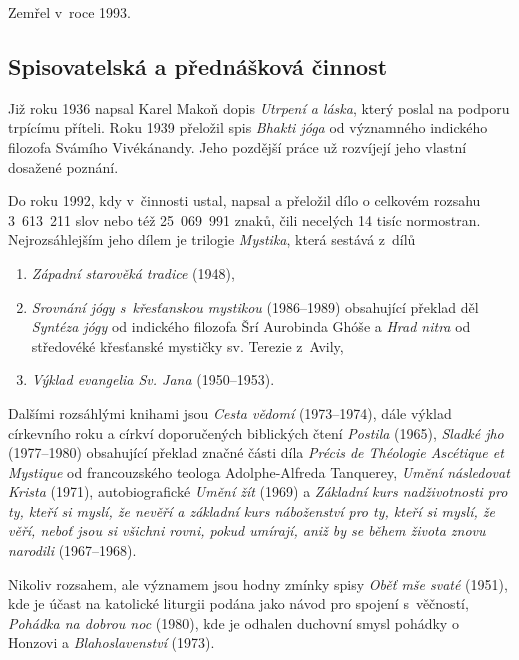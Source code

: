 Zemřel v~roce 1993.

\subsection{Spisovatelská a přednášková činnost}

Již roku 1936 napsal Karel Makoň dopis {\em Utrpení a láska}, který poslal na
podporu trpícímu příteli. Roku 1939 přeložil spis {\em Bhakti
jóga}\cite{vivekananda2003bhakti} od významného indického filozofa Svámího  Vivékánandy.
Jeho pozdější práce už rozvíjejí jeho vlastní dosažené poznání.

Do roku 1992, kdy v~činnosti ustal, napsal a přeložil dílo o celkovém rozsahu
3~613~211 slov nebo též 25~069~991 znaků, čili necelých 14 tisíc normostran.
Nejrozsáhlejším jeho dílem je trilogie {\em Mystika}, která sestává z~dílů
\begin{enumerate}
\item{{\em Západní starověká tradice}  (1948),}
\item{
    {\em Srovnání jógy s~křesťanskou mystikou}
    (1986--1989) obsahující překlad děl
    {\em Syntéza jógy}\cite{aurobindo1999synthesis} od indického filozofa Šrí
    Aurobinda Ghóše
    a {\em Hrad nitra}\cite{teresa1588castillo} od středovéké křesťanské
    mystičky sv. Terezie z~Avily,
}
    \item{{\em Výklad evangelia Sv. Jana} (1950--1953).}
\end{enumerate}

Dalšími rozsáhlými knihami jsou {\em Cesta vědomí} (1973--1974),
dále výklad církevního roku a církví doporučených biblických čtení
{\em Postila} (1965),
{\em Sladké jho} (1977--1980) obsahující překlad značné části díla
{\em Précis de Théologie Ascétique et Mystique}\cite{tanquerey1928precis}
od francouzského teologa Adolphe-Alfreda Tanquerey,
{\em Umění následovat Krista} (1971),
autobiografické {\em Umění žít} (1969)
a {\em Základní kurs nadživotnosti pro ty, kteří si myslí, že nevěří a základní
kurs náboženství pro ty, kteří si myslí, že věří, neboť jsou si všichni rovni,
pokud umírají, aniž by se během života znovu narodili} (1967--1968).

Nikoliv rozsahem, ale významem jsou hodny zmínky spisy
{\em Oběť mše svaté} (1951), kde je účast na katolické liturgii podána jako
návod pro spojení s~věčností,
{\em Pohádka na dobrou noc} (1980), kde je odhalen duchovní smysl pohádky o
Honzovi
a {\em Blahoslavenství} (1973).

